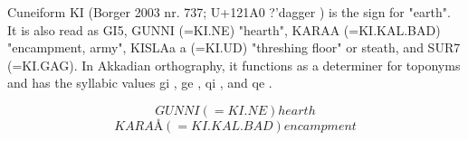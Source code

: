 
\begin{tzpsnapshot}
\end{tzpsnapshot}

Cuneiform KI (Borger 2003 nr. 737; U+121A0 ?'dagger ) is the sign for "earth". It is also read as GI5, GUNNI (=KI.NE) "hearth", KARAA (=KI.KAL.BAD) "encampment, army", KISLAa a (=KI.UD) "threshing floor" or steath, and SUR7 (=KI.GAG). In Akkadian orthography, it functions as a determiner for toponyms and has the syllabic values gi , ge , qi , and qe .

\[
GUNNI (=KI.NE) hearth
\]
\[
KARAÅ (=KI.KAL.BAD) encampment
\]

